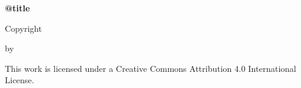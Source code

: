 \begin{center}
  \SingleSpacing \normalsize
  \textbf{\csname @title\endcsname}

  \vspace{5\baselineskip}
  Copyright \MyYear
  \par\vspace{\baselineskip} by
  \par\vspace{\baselineskip} \MyAuthor

  \vspace{5\baselineskip}%
  This work is licensed under a Creative Commons Attribution 4.0 International
  License.
\end{center}

\clearpage
